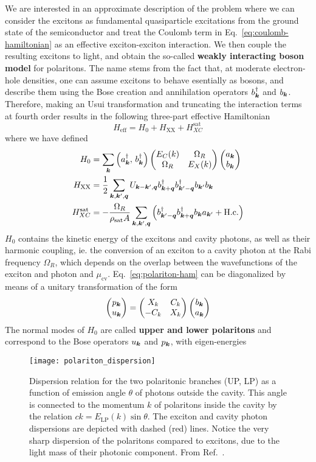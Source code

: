 We are interested in an approximate description of the problem where
we can consider the excitons as fundamental quasiparticle excitations
from the ground state of the semiconductor and treat the Coulomb term
in Eq.~\eqref{eq:coulomb-hamiltonian} as an effective exciton-exciton
interaction. We then couple the resulting excitons to light, and
obtain the so-called \textbf{weakly interacting boson model} for
polaritons. The name stems from the fact that, at moderate
electron-hole densities, one can assume excitons to behave esentially
as bosons, and describe them using the Bose creation and annihilation
operators $b_{\bm{k}}^{\dagger}$ and $b_{\bm{k}}$. Therefore, making an Usui
transformation and truncating the interaction terms at fourth order
results in the following three-part effective Hamiltonian
%
\begin{equation}\label{eq:total-ham}
  H_{\text{eff}} = H_0  + H_{\text{XX}} + H_{XC}^{\text{sat}}
\end{equation}
% 
where we have defined
\begin{align}
  H_0 & =\sum_{\bm{k}}\left(a_{\bm{k}}^{\dagger},\, b_{\bm{k}}^{\dagger}\right)\begin{pmatrix} E_C(k) & \Omega_R\\ \Omega_R & E_X(k) \end{pmatrix}\begin{pmatrix} a_{\bm{k}}\\ b_{\bm{k}} \end{pmatrix}\label{eq:polariton-ham}\\
  H_{\text{XX}} & =\frac{1}{2}\sum_{\bm{k},\bm{k}^{\prime},\bm{q}}U_{\bm{k} - \bm{k}^{\prime},\bm{q}}b_{\bm{k} + \bm{q}}^{\dagger}b_{\bm{k}^{\prime} - \bm{q}}^{\dagger}b_{\bm{k}^{\prime}}b_{\bm{k}}\label{eq:interaction-ham}\\
  H_{XC}^{\text{sat}} & =-\frac{\Omega_R}{\rho_{\text{sat}}A}\sum_{\bm{k},\bm{k}^{\prime},\bm{q}}\left(b_{\bm{k}^{\prime}-\bm{q}}^{\dagger}b_{\bm{k} + \bm{q}}^{\dagger}b_{\bm{k}}a_{\bm{k}^{\prime}} + \text{H.c.}\right)\label{eq:saturation-ham}
\end{align}
$H_0$ contains the kinetic energy of the excitons and cavity photons,
as well as their harmonic coupling, ie. the conversion of an exciton
to a cavity photon at the Rabi frequency $\Omega_R$, which depends on
the overlap between the wavefunctions of the exciton and photon and
$\mu_{\text{cv}}$. Eq.~\eqref{eq:polariton-ham} can be diagonalized by
means of a unitary transformation of the form
%
\begin{equation}\label{eq:hopfield-trans}
  \begin{pmatrix} p_{\bm{k}}\\ u_{\bm{k}} \end{pmatrix} = \begin{pmatrix} X_k & C_k\\ -C_k & X_k \end{pmatrix} \begin{pmatrix} b_{\bm{k}}\\ a_{\bm{k}} \end{pmatrix}
\end{equation}
% 
The normal modes of $H_0$ are called \textbf{upper and lower polaritons} and
correspond to the Bose operators $u_{\bm{k}}$ and $p_{\bm{k}}$, with
eigen-energies
%
\begin{figure}[tb]\centering
  \texttt{[image: polariton\_dispersion]}
  \caption{
    Dispersion relation for the two polaritonic branches (UP, LP) as a function of emission angle $\theta$ of photons outside the cavity. This angle is connected to the momentum $k$ of polaritons inside the cavity by the relation $ck = E_{\text{LP}}(k) \sin \theta$. The exciton and cavity photon dispersions are depicted with dashed (red) lines. Notice the very sharp dispersion of the polaritons compared to excitons, due to the light mass of their photonic component.
From Ref.~\cite{Keeling_2007}.
}\label{fig:polariton-dispersion}
\end{figure}
